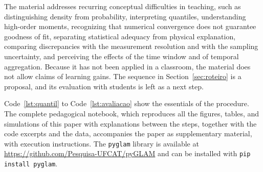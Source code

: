 The material addresses recurring conceptual difficulties in teaching, such as distinguishing density from probability, interpreting quantiles, understanding high-order moments, recognizing that numerical convergence does not guarantee goodness of fit, separating statistical adequacy from physical explanation, comparing discrepancies with the measurement resolution and with the sampling uncertainty, and perceiving the effects of the time window and of temporal aggregation. Because it has not been applied in a classroom, the material does not allow claims of learning gains. The sequence in Section~\ref{sec:roteiro} is a proposal, and its evaluation with students is left as a next step.

Code~\ref{lst:quantil} to Code~\ref{lst:avaliacao} show the essentials of the procedure. The complete pedagogical notebook, which reproduces all the figures, tables, and simulations of this paper with explanations between the steps, together with the code excerpts and the data, accompanies the paper as supplementary material, with execution instructions. The \texttt{pyglam} library is available at \url{https://github.com/Pesquisa-UFCAT/pyGLAM} and can be installed with \texttt{pip install pyglam}.
